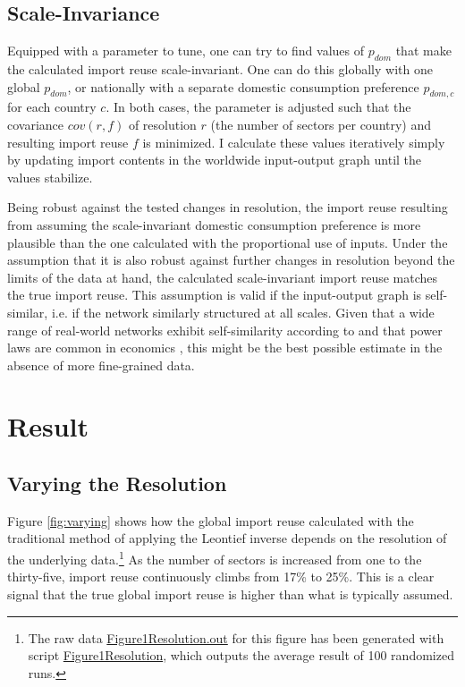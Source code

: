 \documentclass[english]{uzhpub}
\begin{document}
\subsection{Scale-Invariance}
\label{met:scale-invariance}
Equipped with a parameter to tune, one can try to find values of $p_{dom}$ that make the calculated import reuse scale-invariant. One can do this globally with one global $p_{dom}$, or nationally with a separate domestic consumption preference $p_{dom,c}$ for each country $c$. In both cases, the parameter is adjusted such that the covariance $cov(r, f)$ of resolution $r$ (the number of sectors per country) and resulting import reuse $f$ is minimized. I calculate these values iteratively simply by updating import contents in the worldwide input-output graph until the values stabilize.

Being robust against the tested changes in resolution, the import reuse resulting from assuming the scale-invariant domestic consumption preference is more plausible than the one calculated with the proportional use of inputs. Under the assumption that it is also robust against further changes in resolution beyond the limits of the data at hand, the calculated scale-invariant import reuse matches the true import reuse. This assumption is valid if the input-output graph is self-similar, i.e. if the network similarly structured at all scales. Given that a wide range of real-world networks exhibit self-similarity according to \cite{song2005self} and that power laws are common in economics \citep{gabaix2016power}, this might be the best possible estimate in the absence of more fine-grained data.

\section{Result}
\label{sec:result}

\subsection{Varying the Resolution}
\label{res:varying}

Figure \ref{fig:varying} shows how the global import reuse calculated with the traditional method of applying the Leontief inverse depends on the resolution of the underlying data.\footnote{The raw data \href{https://github.com/meisserecon/importreuse/blob/master/src/com/meissereconomics/seminar/run/Figure1Resolution.out}{Figure1Resolution.out} for this figure has been generated with script \href{https://github.com/meisserecon/importreuse/blob/master/src/com/meissereconomics/seminar/run/Figure1Resolution.java}{Figure1Resolution}, which outputs the average result of 100 randomized runs.} As the number of sectors is increased from one to the thirty-five, import reuse continuously climbs from 17\% to 25\%. This is a clear signal that the true global import reuse is higher than what is typically assumed.
\end{document}
